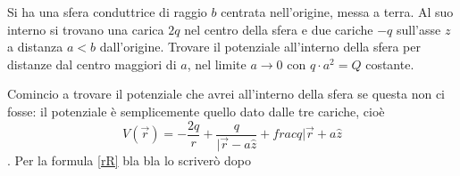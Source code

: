 \documentclass[../main.tex]{subfiles}
\begin{document}

\textex
Si ha una sfera conduttrice di raggio $b$ centrata nell'origine, messa a terra. Al suo interno si trovano una carica $2q$ nel centro della sfera e due cariche $-q$ sull'asse $z$ a distanza $a < b$ dall'origine. Trovare il potenziale all'interno della sfera per distanze dal centro maggiori di $a$, nel limite $a \rightarrow 0$ con $q\cdot a^2 = Q$ costante.

\solution

Comincio a trovare il potenziale che avrei all'interno della sfera se questa non ci fosse: il potenziale è semplicemente quello dato dalle tre cariche, cioè
$$ V(\vec r) = -\frac{2q}{r} + \frac{q}{|\vec r - a\hat z } + frac{q}{|\vec r + a\hat z } $$.
Per la formula \cref{rR} bla bla lo scriverò dopo
\end{document}
